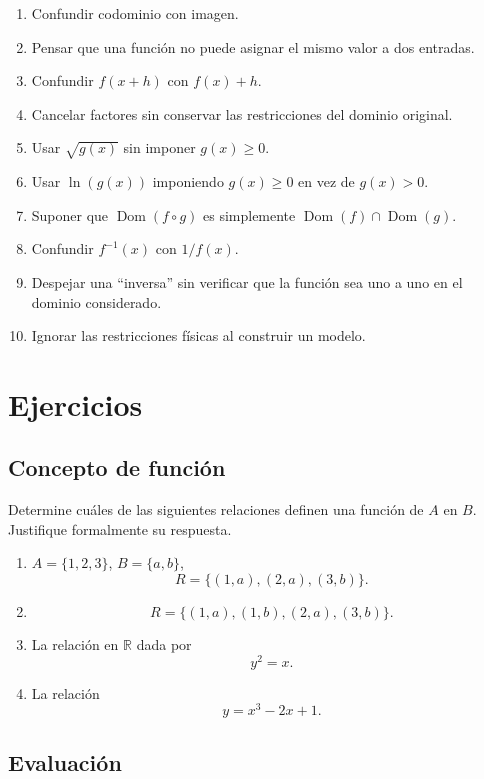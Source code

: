 \documentclass[12pt]{article}
\theoremstyle{remark}
\newcommand{\R}{\mathbb{R}}
\newcommand{\Dom}{\operatorname{Dom}}
\begin{document}
\begin{enumerate}
    \item Confundir codominio con imagen.
    \item Pensar que una función no puede asignar el mismo valor a dos entradas.
    \item Confundir $f(x+h)$ con $f(x)+h$.
    \item Cancelar factores sin conservar las restricciones del dominio original.
    \item Usar $\sqrt{g(x)}$ sin imponer $g(x)\geq0$.
    \item Usar $\ln(g(x))$ imponiendo $g(x)\geq0$ en vez de $g(x)>0$.
    \item Suponer que $\Dom(f\circ g)$ es simplemente
    $\Dom(f)\cap\Dom(g)$.
    \item Confundir $f^{-1}(x)$ con $1/f(x)$.
    \item Despejar una ``inversa'' sin verificar que la función sea uno a uno en
    el dominio considerado.
    \item Ignorar las restricciones físicas al construir un modelo.
\end{enumerate}

\section{Ejercicios}

\subsection{Concepto de función}

Determine cuáles de las siguientes relaciones definen una función de $A$ en
$B$. Justifique formalmente su respuesta.

\begin{enumerate}
    \item $A=\{1,2,3\}$, $B=\{a,b\}$,
    \[
    R=\{(1,a),(2,a),(3,b)\}.
    \]
    \item
    \[
    R=\{(1,a),(1,b),(2,a),(3,b)\}.
    \]
    \item La relación en $\R$ dada por
    \[
    y^2=x.
    \]
    \item La relación
    \[
    y=x^3-2x+1.
    \]
\end{enumerate}

\subsection{Evaluación}
\end{document}
